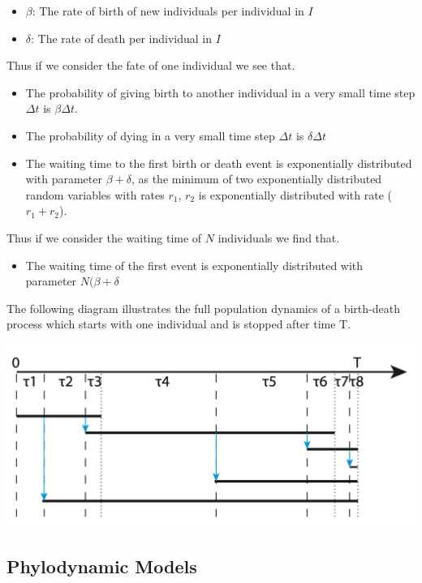 \documentclass{article}
\begin{document}
\begin{multicols*}{3}
\begin{itemize}
    \item $\beta$: The rate of birth of new individuals per individual in $I$
    \item $\delta$: The rate of death per individual in $I$
\end{itemize}

Thus if we consider the fate of one individual we see that. 
\begin{itemize}
    \item The probability of giving birth to another individual in a very small time step $\Delta t$ is $\beta \Delta t$.
    \item The probability of dying in a very small time step $\Delta t$ is $\delta \Delta t$
    \item The waiting time to the first birth or death event is exponentially distributed with parameter $\beta + \delta$, as the minimum of two exponentially distributed random variables with rates $r_1$, $r_2$ is exponentially distributed with rate ($r_1 + r_2$). 
\end{itemize}

Thus if we consider the waiting time of $N$ individuals we find that.
\begin{itemize}
\item The waiting time of the first event is exponentially distributed with parameter $N(\beta + \delta$
\end{itemize}

The following diagram illustrates the full population dynamics of a birth-death process which starts with one individual and is stopped after time T. 

\begin{center}
    \includegraphics[width=1\linewidth, angle=0.0]{bddiagram.png}
\end{center}

\subsection{Phylodynamic Models}


\end{multicols*}
\end{document}
